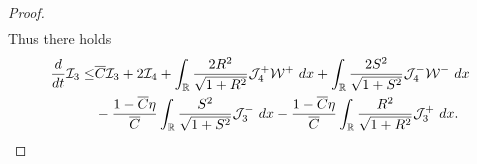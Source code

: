 \documentclass[10pt,a4paper]{amsart}
\newcommand{\fr}{\frac}
\begin{document}
\begin{proof}
\begin{align}
\end{align}
Thus there holds
\begin{align}\label{6.35e}
\begin{split}
\fr{{\rm d}}{{\rm d}t}\mathcal{I}_3
\leq &\overline{C}\mathcal{I}_3  +2\mathcal{I}_4  +\int_{\mathbb{R}}  \fr{2R^2}{\sqrt{1+R^2}}\mathcal{J}_{4}^+\mathcal{W}^+\ {\rm d}x  +\int_{\mathbb{R}}  \fr{2S^2}{\sqrt{1+S^2}}\mathcal{J}_{4}^-\mathcal{W}^-\ {\rm d}x  \\ &-\fr{1-\overline{C}\eta}{\overline{C}}\int_{\mathbb{R}}  \fr{S^2}{\sqrt{1+S^2}} \mathcal{J}_{3}^-\ {\rm d}x -\fr{1-\overline{C}\eta}{\overline{C}}\int_{\mathbb{R}}  \fr{R^2}{\sqrt{1+R^2}} \mathcal{J}_{3}^+\ {\rm d}x.
\end{split}
\end{align}




\end{proof}
\end{document}
